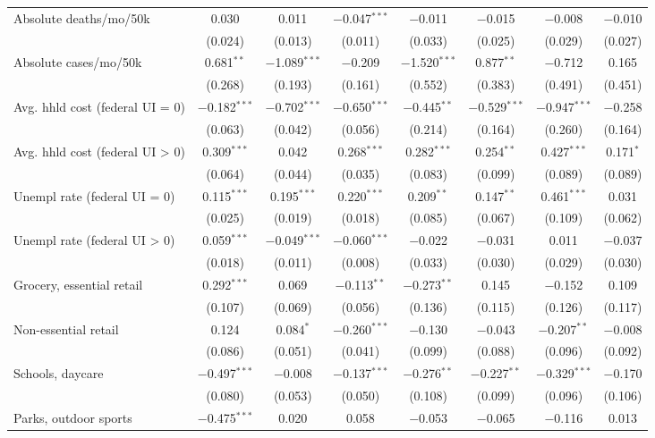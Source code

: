 \begin{table}[!htbp]
\begin{tabular}{@{\extracolsep{5pt}}lccccccc}
 Absolute deaths/mo/50k & 0.030 & 0.011 & $-$0.047$^{***}$ & $-$0.011 & $-$0.015 & $-$0.008 & $-$0.010 \\ 
  & (0.024) & (0.013) & (0.011) & (0.033) & (0.025) & (0.029) & (0.027) \\ 
  Absolute cases/mo/50k & 0.681$^{**}$ & $-$1.089$^{***}$ & $-$0.209 & $-$1.520$^{***}$ & 0.877$^{**}$ & $-$0.712 & 0.165 \\ 
  & (0.268) & (0.193) & (0.161) & (0.552) & (0.383) & (0.491) & (0.451) \\ 
  Avg. hhld cost (federal UI = 0) & $-$0.182$^{***}$ & $-$0.702$^{***}$ & $-$0.650$^{***}$ & $-$0.445$^{**}$ & $-$0.529$^{***}$ & $-$0.947$^{***}$ & $-$0.258 \\ 
  & (0.063) & (0.042) & (0.056) & (0.214) & (0.164) & (0.260) & (0.164) \\ 
  Avg. hhld cost (federal UI > 0) & 0.309$^{***}$ & 0.042 & 0.268$^{***}$ & 0.282$^{***}$ & 0.254$^{**}$ & 0.427$^{***}$ & 0.171$^{*}$ \\ 
  & (0.064) & (0.044) & (0.035) & (0.083) & (0.099) & (0.089) & (0.089) \\ 
  Unempl rate (federal UI = 0) & 0.115$^{***}$ & 0.195$^{***}$ & 0.220$^{***}$ & 0.209$^{**}$ & 0.147$^{**}$ & 0.461$^{***}$ & 0.031 \\ 
  & (0.025) & (0.019) & (0.018) & (0.085) & (0.067) & (0.109) & (0.062) \\ 
  Unempl rate (federal UI > 0) & 0.059$^{***}$ & $-$0.049$^{***}$ & $-$0.060$^{***}$ & $-$0.022 & $-$0.031 & 0.011 & $-$0.037 \\ 
  & (0.018) & (0.011) & (0.008) & (0.033) & (0.030) & (0.029) & (0.030) \\ 
  Grocery, essential retail & 0.292$^{***}$ & 0.069 & $-$0.113$^{**}$ & $-$0.273$^{**}$ & 0.145 & $-$0.152 & 0.109 \\ 
  & (0.107) & (0.069) & (0.056) & (0.136) & (0.115) & (0.126) & (0.117) \\ 
  Non-essential retail & 0.124 & 0.084$^{*}$ & $-$0.260$^{***}$ & $-$0.130 & $-$0.043 & $-$0.207$^{**}$ & $-$0.008 \\ 
  & (0.086) & (0.051) & (0.041) & (0.099) & (0.088) & (0.096) & (0.092) \\ 
  Schools, daycare & $-$0.497$^{***}$ & $-$0.008 & $-$0.137$^{***}$ & $-$0.276$^{**}$ & $-$0.227$^{**}$ & $-$0.329$^{***}$ & $-$0.170 \\ 
  & (0.080) & (0.053) & (0.050) & (0.108) & (0.099) & (0.096) & (0.106) \\ 
  Parks, outdoor sports & $-$0.475$^{***}$ & 0.020 & 0.058 & $-$0.053 & $-$0.065 & $-$0.116 & 0.013 \\ 

\end{tabular}
\end{table}
